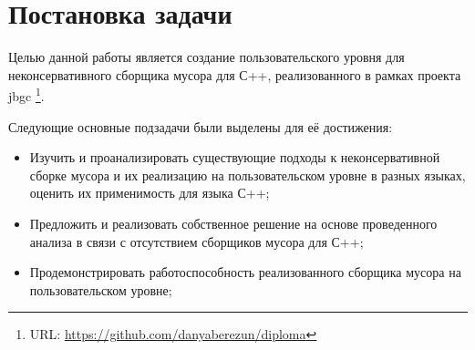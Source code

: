 \section{Постановка задачи}
Целью данной работы является создание пользовательского уровня для неконсервативного сборщика мусора для С++, реализованного в рамках проекта jbgc \footnote{URL: \url{https://github.com/danyaberezun/diploma}}.


\vspace{0.3cm}
 Следующие основные подзадачи были выделены для её достижения:
\begin{itemize}
\item Изучить и проанализировать существующие подходы к неконсервативной сборке мусора и их реализацию на пользовательском уровне в разных языках, оценить их применимость для языка С++;
\item Предложить и реализовать собственное решение на основе проведенного анализа в связи с отсутствием сборщиков мусора для С++;
\item Продемонстрировать работоспособность реализованного сборщика мусора на пользовательском уровне;

\end{itemize}